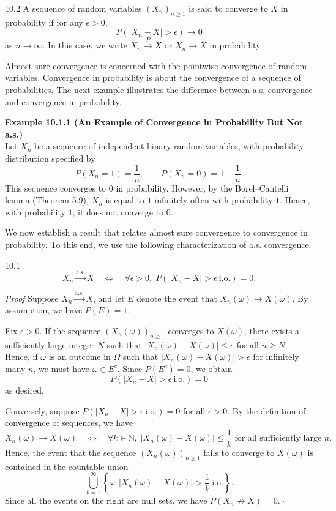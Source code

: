 \begin{defbox}{10.2}
A sequence of random variables $(X_n)_{n\geq 1}$ is said to converge to $X$ in probability if for any $\epsilon>0$,
\[
P(\lvert X_n-X\rvert>\epsilon)\to 0
\]
as $n\to\infty$. In this case, we write $X_n\xrightarrow{P}X$ or $X_n\to X$ in probability.
\end{defbox}

Almost sure convergence is concerned with the pointwise convergence of random variables. Convergence in probability is about the convergence of a sequence of probabilities. The next example illustrates the difference between a.s. convergence and convergence in probability.

\textbf{Example 10.1.1 (An Example of Convergence in Probability But Not a.s.)} \\
Let $X_n$ be a sequence of independent binary random variables, with probability distribution specified by
\[
P(X_n=1)=\frac{1}{n}, \qquad P(X_n=0)=1-\frac{1}{n}.
\]
This sequence converges to $0$ in probability. However, by the Borel--Cantelli lemma (Theorem 5.9), $X_n$ is equal to $1$ infinitely often with probability $1$. Hence, with probability $1$, it does not converge to $0$.

We now establish a result that relates almost sure convergence to convergence in probability. To this end, we use the following characterization of a.s. convergence.

\begin{thmbox}{10.1}
\[
X_n\xrightarrow{\mathrm{a.s.}}X
\quad\Longleftrightarrow\quad
\forall \epsilon>0,\; P(\lvert X_n-X\rvert>\epsilon\ \mathrm{i.o.})=0.
\]
\end{thmbox}

\textit{Proof}
Suppose $X_n\xrightarrow{\mathrm{a.s.}}X$, and let $E$ denote the event that $X_n(\omega)\to X(\omega)$. By assumption, we have $P(E)=1$.

Fix $\epsilon>0$. If the sequence $(X_n(\omega))_{n\geq 1}$ converges to $X(\omega)$, there exists a sufficiently large integer $N$ such that $\lvert X_n(\omega)-X(\omega)\rvert\leq\epsilon$ for all $n\geq N$. Hence, if $\omega$ is an outcome in $\Omega$ such that $\lvert X_n(\omega)-X(\omega)\rvert>\epsilon$ for infinitely many $n$, we must have $\omega\in E^c$. Since $P(E^c)=0$, we obtain
\[
P(\lvert X_n-X\rvert>\epsilon\ \mathrm{i.o.})=0
\]
as desired.

Conversely, suppose $P(\lvert X_n-X\rvert>\epsilon\ \mathrm{i.o.})=0$ for all $\epsilon>0$. By the definition of convergence of sequences, we have
\[
X_n(\omega)\to X(\omega)
\quad\Longleftrightarrow\quad
\forall k\in\mathbb{N},\; \lvert X_n(\omega)-X(\omega)\rvert\leq \frac{1}{k}
\text{ for all sufficiently large }n.
\]
Hence, the event that the sequence $(X_n(\omega))_{n\geq 1}$ fails to converge to $X(\omega)$ is contained in the countable union
\[
\bigcup_{k=1}^{\infty}
\left\{\omega:\lvert X_n(\omega)-X(\omega)\rvert>\frac{1}{k}\ \mathrm{i.o.}\right\}.
\]
Since all the events on the right are null sets, we have $P(X_n\not\to X)=0$.
\hfill $\square$


